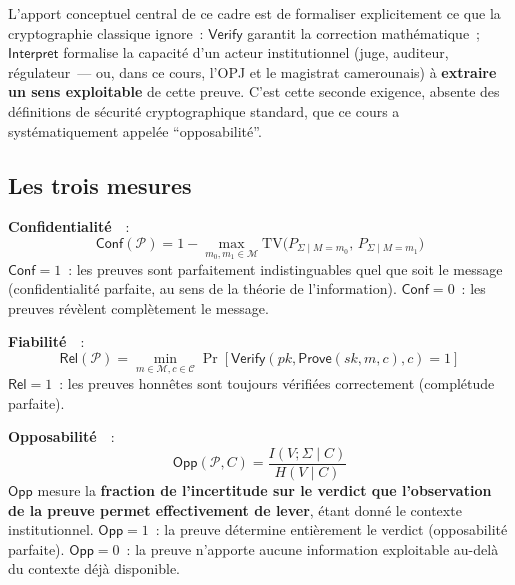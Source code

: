 L'apport conceptuel central de ce cadre est de formaliser
explicitement ce que la cryptographie classique ignore~:
$\mathsf{Verify}$ garantit la correction mathématique~;
$\mathsf{Interpret}$ formalise la capacité d'un acteur institutionnel
(juge, auditeur, régulateur~--- ou, dans ce cours, l'OPJ et le
magistrat camerounais) à \textbf{extraire un sens exploitable} de
cette preuve. C'est cette seconde exigence, absente des définitions
de sécurité cryptographique standard, que ce cours a systématiquement
appelée ``opposabilité''.

\subsection{Les trois mesures}

\begin{boxdef}
\textbf{Confidentialité}~\cite{minka2026clo}~:
\begin{equation}
\mathsf{Conf}(\mathcal{P}) = 1 - \max_{m_0,m_1 \in \mathcal{M}}
\mathrm{TV}\bigl(P_{\Sigma \mid M=m_0},\, P_{\Sigma \mid M=m_1}\bigr)
\label{eq:conf}
\end{equation}
$\mathsf{Conf} = 1$~: les preuves sont parfaitement indistinguables
quel que soit le message (confidentialité parfaite, au sens de la
théorie de l'information). $\mathsf{Conf} = 0$~: les preuves
révèlent complètement le message.

\textbf{Fiabilité}~\cite{minka2026clo}~:
\begin{equation}
\mathsf{Rel}(\mathcal{P}) = \min_{m \in \mathcal{M}, c \in \mathcal{C}}
\Pr[\mathsf{Verify}(pk, \mathsf{Prove}(sk,m,c), c) = 1]
\label{eq:rel}
\end{equation}
$\mathsf{Rel} = 1$~: les preuves honnêtes sont toujours vérifiées
correctement (complétude parfaite).

\textbf{Opposabilité}~\cite{minka2026clo}~:
\begin{equation}
\mathsf{Opp}(\mathcal{P}, C) = \frac{I(V; \Sigma \mid C)}{H(V \mid C)}
\label{eq:opp}
\end{equation}
$\mathsf{Opp}$ mesure la \textbf{fraction de l'incertitude sur le
verdict que l'observation de la preuve permet effectivement de
lever}, étant donné le contexte institutionnel. $\mathsf{Opp} = 1$~:
la preuve détermine entièrement le verdict (opposabilité parfaite).
$\mathsf{Opp} = 0$~: la preuve n'apporte aucune information
exploitable au-delà du contexte déjà disponible.
\end{boxdef}

